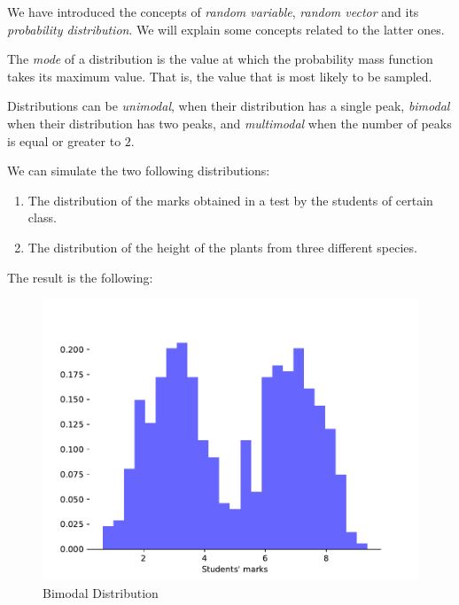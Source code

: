 \label{Chapter:distributions}

We have introduced the concepts of \emph{random variable},  \emph{random vector} and its \emph{probability distribution}. We will explain some concepts related to the latter ones.

\begin{ndef}
    The \emph{mode} of a distribution is the value at which the probability mass function takes its maximum value. That is, the value that is most likely to be sampled.
\end{ndef}

Distributions can be \emph{unimodal}, when their distribution has a single peak, \emph{bimodal} when their distribution has two peaks, and \emph{multimodal} when the number of peaks is equal or greater to $2$. 

\begin{nexample}
We can simulate the two following distributions:
\begin{enumerate}
    \item The distribution of the marks obtained in a test by the students of certain class.
    \item The distribution of the height of the plants from three different species.
\end{enumerate}
The result is the following:
\begin{figure}[H]%
      \includegraphics[width=\linewidth]{media/bimodal.pdf}
      \caption{Bimodal Distribution}\label{fig:linCM}
    \endminipage\hfill

\end{figure}
\end{nexample}
